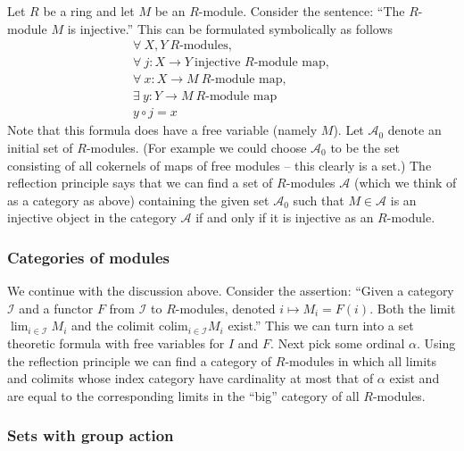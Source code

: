 \noindent
Let $R$ be a ring and let $M$ be an $R$-module.
Consider the sentence: ``The $R$-module $M$ is injective.''
This can be formulated symbolically as follows
\begin{eqnarray*}
\forall\ X,Y\ \text{$R$-modules},\\
\forall\ j : X\to Y\ \text{injective $R$-module map},\\
\forall\ x : X\to M\ \text{$R$-module map},\\
\exists\ y : Y\to M\ \text{$R$-module map}\\
y \circ j = x
\end{eqnarray*}
Note that this formula does have a free variable (namely $M$).
Let $\mathcal{A}_0$ denote an initial set of $R$-modules.
(For example we could choose $\mathcal{A}_0$ to be the set
consisting of all cokernels of maps of free modules -- this
clearly is a set.)
The reflection principle says that we can find a set
of $R$-modules $\mathcal{A}$ (which we think of as a category
as above) containing the given set $\mathcal{A}_0$
such that $M \in \mathcal{A}$ is an injective
object in the category $\mathcal{A}$ if and only if
it is injective as an $R$-module. 

\subsubsection{Categories of modules}

\noindent
We continue with the discussion above.
Consider the assertion: ``Given a category $\mathcal{I}$
and a functor $F$ from $\mathcal{I}$ to $R$-modules,
denoted $i \mapsto M_i = F(i)$. Both the limit $\lim_{i\in \mathcal{I}} M_i$
and the colimit $\text{colim}_{i \in \mathcal{I}} M_i$ exist.'' 
This we can turn into a set theoretic formula with free
variables for $I$ and $F$. Next pick some ordinal $\alpha$.
Using the reflection principle
we can find a category of $R$-modules
in which all limits and colimits whose index category 
have cardinality at most that of $\alpha$ exist and
are equal to the corresponding limits in the ``big''
category of all $R$-modules.

\subsubsection{Sets with group action}
\label{subsubsection-sets-with-group-action}

